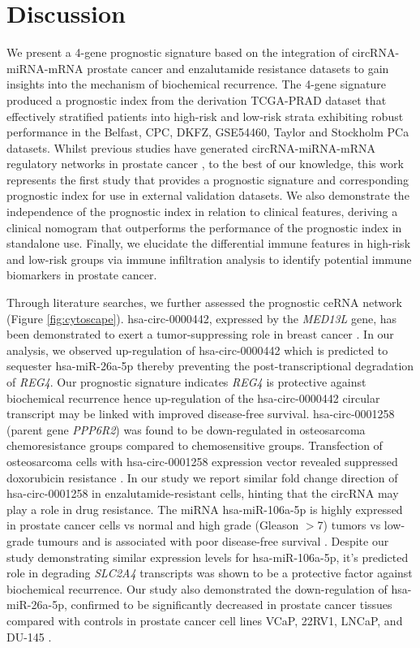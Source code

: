 \documentclass[twocolumn]{bmcart}%
\begin{document}
\section*{Discussion}
We present a 4-gene prognostic signature based on the integration of circRNA-miRNA-mRNA prostate cancer and enzalutamide resistance datasets to gain insights into the mechanism of biochemical recurrence. The 4-gene signature produced a prognostic index from the derivation TCGA-PRAD dataset that effectively stratified patients into high-risk and low-risk strata exhibiting robust performance in the Belfast, CPC, DKFZ, GSE54460, Taylor and Stockholm PCa datasets. Whilst previous studies have generated circRNA-miRNA-mRNA regulatory networks in prostate cancer \cite{Luo2021Dec}, to the best of our knowledge, this work represents the first study that provides a prognostic signature and corresponding prognostic index for use in external validation datasets. We also demonstrate the independence of the prognostic index in relation to clinical features, deriving a clinical nomogram that outperforms the performance of the prognostic index in standalone use. Finally, we elucidate the differential immune features in high-risk and low-risk groups via immune infiltration analysis to identify potential immune biomarkers in prostate cancer. \par
Through literature searches, we further assessed the prognostic ceRNA network (Figure \ref{fig:cytoscape}). hsa-circ-0000442, expressed by the \textit{MED13L} gene, has been demonstrated to exert a tumor-suppressing role in breast cancer \cite{Zhang2021Jan}. In our analysis, we observed up-regulation of hsa-circ-0000442 which is predicted to sequester hsa-miR-26a-5p thereby preventing the post-transcriptional degradation of \textit{REG4}. Our prognostic signature indicates \textit{REG4} is protective against biochemical recurrence hence up-regulation of the hsa-circ-0000442 circular transcript may be linked with improved disease-free survival. hsa-circ-0001258 (parent gene \textit{PPP6R2}) was found to be down-regulated in osteosarcoma chemoresistance groups compared to chemosensitive groups. Transfection of osteosarcoma cells with hsa-circ-0001258 expression vector revealed suppressed doxorubicin resistance \cite{Zhu2019Mar}. In our study we report similar fold change direction of hsa-circ-0001258 in enzalutamide-resistant cells, hinting that the circRNA may play a role in drug resistance. The miRNA hsa-miR-106a-5p is highly expressed in prostate cancer cells vs normal and high grade (Gleason $>$7) tumors vs low-grade tumours and is associated with poor disease-free survival \cite{Hoey2018Aug}. Despite our study demonstrating similar expression levels for hsa-miR-106a-5p, it's predicted role in degrading \textit{SLC2A4} transcripts was shown to be a protective factor against biochemical recurrence. Our study also demonstrated the down-regulation of hsa-miR-26a-5p, confirmed to be significantly decreased in prostate cancer tissues compared with controls in prostate cancer cell lines VCaP, 22RV1, LNCaP, and DU-145 \cite{Guo2016Sep}. \par
\end{document}
